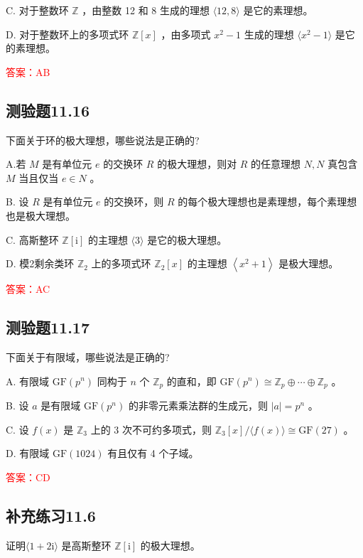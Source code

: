 \documentclass[UTF8, heading=true]{ctexart}
\begin{document}
C.
对于整数环 $\mathbb{Z}$ ，由整数 12 和 8 生成的理想 $\langle 12,8\rangle$ 是它的素理想。

D.
对于整数环上的多项式环 $\mathbb{Z}[x]$ ，由多项式 $x^2-1$ 生成的理想 $\langle x^2-1 \rangle$ 是它的素理想。


\textcolor{red}{答案：AB}

\subsection{测验题11.16}

下面关于环的极大理想，哪些说法是正确的?

A.若 $M$ 是有单位元 $e$ 的交换环 $R$ 的极大理想，则对 $R$ 的任意理想 $N, N$ 真包含 $M$ 当且仅当 $e \in N$ 。

B.
设 $R$ 是有单位元 $e$ 的交换环，则 $R$ 的每个极大理想也是素理想，每个素理想也是极大理想。

C.
高斯整环 $\mathbb{Z}[\mathrm{i}]$ 的主理想 $\langle 3\rangle$ 是它的极大理想。

D.
模2剩余类环 $\mathbb{Z}_2$ 上的多项式环 $\mathbb{Z}_2[x]$ 的主理想 $\left\langle x^2+1\right\rangle$ 是极大理想。

\textcolor{red}{答案：AC}

\subsection{测验题11.17}

下面关于有限域，哪些说法是正确的?

A. 有限域 $\mathrm{GF}\left(p^n\right)$ 同构于 $n$ 个 $\mathbb{Z}_p$ 的直和，即 $\mathrm{GF}\left(p^n\right) \cong \mathbb{Z}_p \oplus \cdots \oplus \mathbb{Z}_p$ 。

B. 设 $a$ 是有限域 $\mathrm{GF}\left(p^n\right)$ 的非零元素乘法群的生成元，则 $|a|=p^n$ 。

C. 设 $f(x)$ 是 $\mathbb{Z}_3$ 上的 3 次不可约多项式，则 $\mathbb{Z}_3[x] /\langle f(x)\rangle \cong \mathrm{GF}(27)$ 。

D. 有限域 $\mathrm{GF}(1024)$ 有且仅有 4 个子域。


\textcolor{red}{答案：CD}

\subsection{补充练习11.6}

证明$\langle 1+2 \mathrm{i}\rangle$ 是高斯整环 $\mathbb{Z}[\mathrm{i}]$ 的极大理想。
\end{document}
